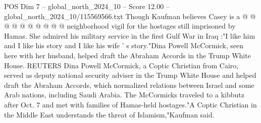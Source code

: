 \begin{textsample}{POS Dim 7 – global\_north\_2024\_10 – Score 12.00 – global\_north\_2024\_10/115569566.txt}
Though Kaufman believes Casey is a @ @ @ @ @ @ @ @ @ @ neighborhood vigil for the hostages still imprisoned by Hamas.
She admired his military service in the first Gulf War in Iraq :"I like him and I like his story and I like his wife ' s story."Dina Powell McCormick, seen here with her husband, helped draft the Abraham Accords in the Trump White House.
REUTERS Dina Powell McCormick, a Coptic Christian from Cairo, served as deputy national security adviser in the Trump White House and helped draft the Abraham Accords, which normalized relations between Israel and some Arab nations, including Saudi Arabia.
The McCormicks traveled to a kibbutz after Oct. 7 and met with families of Hamas-held hostages."A Coptic Christian in the Middle East understands the threat of Islamism,"Kaufman said.

\end{textsample}
